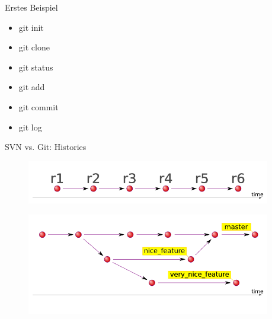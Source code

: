 \documentclass{beamer}
\begin{document}
\begin{frame}

  \begin{block}{Erstes Beispiel}
    \begin{itemize}
      \item git init
      \item git clone
      \item git status
      \item git add
      \item git commit
      \item git log
    \end{itemize}
  \end{block} 

\end{frame}

\begin{frame}{SVN vs. Git: Histories}

  \begin{figure}
   \includegraphics[width=0.95\textwidth]{./images/svn-timeline.png}
  \end{figure}

  \begin{figure}
   \includegraphics[width=0.95\textwidth]{./images/git-timeline.png}
  \end{figure}

\end{frame}
\end{document}
